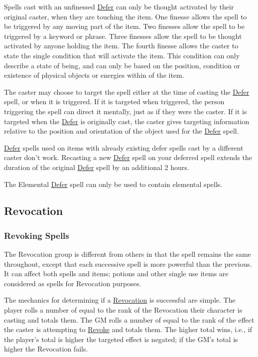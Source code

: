 Spells cast with an unfinessed \ul{Defer} can only be thought activated by their original caster, when they are touching the item. One finesse allows the spell to be triggered by any moving part of the item. Two finesses allow the spell to be triggered by a keyword or phrase. Three finesses allow the spell to be thought activated by anyone holding the item. The fourth finesse allows the caster to state the single condition that will activate the item. This condition can only describe a state of being, and can only be based on the position, condition or existence of physical objects or energies within  of the item.

The caster may choose to target the spell either at the time of casting the \ul{Defer} spell, or when it is triggered. If it is targeted when triggered, the person triggering the spell can direct it mentally, just as if they were the caster. If it is targeted when the \ul{Defer} is originally cast, the caster gives targeting information relative to the position and orientation of the object used for the \ul{Defer} spell.

\ul{Defer} spells used on items with already existing defer spells cast by a different caster don’t work. Recasting a new \ul{Defer} spell on your deferred spell extends the duration of the original \ul{Defer} spell by an additional 2 hours.

The Elemental \ul{Defer} spell can only be used to contain elemental spells.

\subsection{Revocation}


\subsubsection{Revoking Spells}

The Revocation group is different from others in that the spell remains the same throughout, except that each successive spell is more powerful than the previous. It can affect both spells and items; potions and other single use items are considered as spells for Revocation purposes.

The mechanics for determining if a \ul{Revocation} is successful are simple. The player rolls a number of  equal to the rank of the Revocation their character is casting and totals them. The GM rolls a number of  equal to the rank of the effect the caster is attempting to \ul{Revoke} and totals them. The higher total wins, i.e., if the player's total is higher the targeted effect is negated; if the GM's total is higher the Revocation fails.

